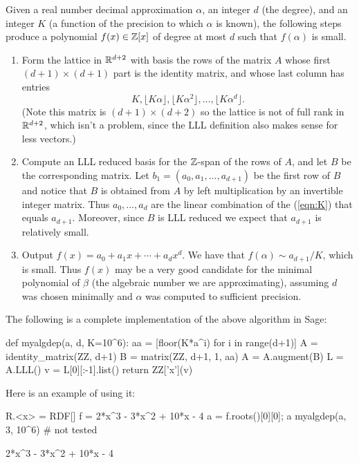 Given a real number decimal approximation $\alpha$, an
integer $d$ (the degree), and an integer $K$ (a function
of the precision to which $\alpha$ is known), the following
steps produce a polynomial $f(x) \in \mathbb{Z}[x]$ of degree
at most $d$ such that $f(\alpha)$ is small.
\begin{enumerate}
	\item Form the lattice in $\mathbb{R}^{d+2}$ with basis the rows
	of the matrix $A$ whose first $(d+1) \times (d+1)$ part is the
	identity matrix, and whose last column has entries
	\begin{equation}\label{eqn:K}
		K, \lfloor K\alpha \rfloor, \lfloor K\alpha^2 \rfloor,
		\ldots, \lfloor K\alpha^{d} \rfloor.
	\end{equation}
	(Note this matrix is $(d+1) \times (d+2)$ so the lattice
	is not of full rank in $\mathbb{R}^{d+2}$, which isn't a problem,
	since the LLL definition also makes sense for less vectors.)

	\item Compute an LLL reduced basis for the $\mathbb{Z}$-span of the rows
	of $A$, and let $B$ be the corresponding matrix.
	Let $b_1 = (a_0, a_1, \ldots, a_{d+1})$ be the first
	row of $B$ and notice that $B$ is obtained from $A$
	by left multiplication by an invertible integer matrix.
	Thus $a_0,\ldots, a_d$ are the linear combination of the
	(\ref{eqn:K}) that equals $a_{d+1}$. Moreover, since $B$
	is LLL reduced we expect that $a_{d+1}$ is relatively small.

	\item Output $f(x) = a_0 + a_1 x + \cdots + a_{d} x^d$.
	We have that $f(\alpha) \sim a_{d+1}/K$, which is small.
	Thus $f(x)$ may be a very good candidate for the minimal
	polynomial of $\beta$ (the algebraic number we are approximating),
	assuming $d$ was chosen minimally and $\alpha$ was computed
	to sufficient precision.
\end{enumerate}

The following is a complete implementation of the above algorithm
in Sage:
\begin{sagecode}
\begin{sagecell}
def myalgdep(a, d, K=10^6):
    aa = [floor(K*a^i) for i in range(d+1)]
    A = identity_matrix(ZZ, d+1)
    B = matrix(ZZ, d+1, 1, aa)
    A = A.augment(B)
    L = A.LLL()
    v = L[0][:-1].list()
    return ZZ['x'](v)
\end{sagecell}
\end{sagecode}

Here is an example of using it:
\begin{sagecode}
\begin{sagecell}
R.<x> = RDF[]
f = 2*x^3 - 3*x^2 + 10*x - 4
a = f.roots()[0][0]; a
myalgdep(a, 3, 10^6)       # not tested
\end{sagecell}
\begin{sageout}
2*x^3 - 3*x^2 + 10*x - 4
\end{sageout}
\end{sagecode}


